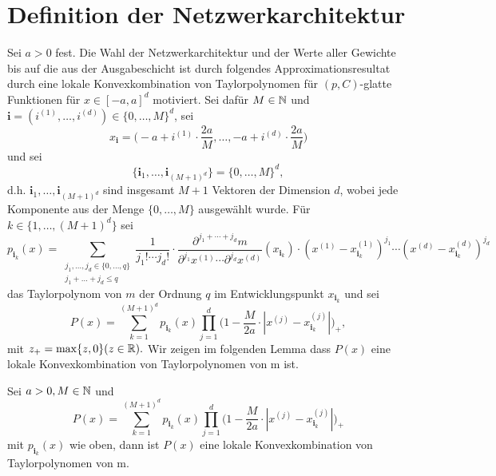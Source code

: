 \section{Definition der Netzwerkarchitektur}
Sei $a > 0$ fest. Die Wahl der Netzwerkarchitektur und der Werte aller Gewichte bis auf die aus der Ausgabeschicht ist durch folgendes Approximationsresultat durch eine lokale Konvexkombination von Taylorpolynomen für $(p,C)$-glatte Funktionen für $x \in [-a, a]^d$ motiviert. 
Sei dafür $M \in \mathbb{N}$ und $\mathbf{i} = (i^{(1)},\dots,i^{(d)}) \in \{0,\dots, M\}^d$, sei
$$x_{\mathbf{i}} = \bigg( -a + i^{(1)} \cdot \frac{2a}{M},\dots, -a + i^{(d)} \cdot \frac{2a}{M}\bigg)$$
und sei
$$\{\mathbf{i}_1,\dots, \mathbf{i}_{(M + 1)^d}\} = \{0,\dots,M\}^d,$$
d.h.  $\mathbf{i}_1,\dots,\mathbf{
i}_{(M + 1)^d}$ sind insgesamt $M + 1$ Vektoren der Dimension $d$, wobei jede Komponente aus der Menge $\{0,\dots,M\}$ ausgewählt wurde.
Für $k \in \{1,\dots,(M + 1)^d\}$ sei
$$p_{\mathbf{i}_k}(x) = \sum_{\substack{j_1,\dots,j_d \in \{0,\dots,q\} \\j_1+\dots +j_d \leq q}} \frac{1}{j_1! \cdots j_d!} \cdot \frac{\partial^{j_1+\cdots + j_d} m}{\partial^{j_1} x^{(1)}\cdots \partial^{j_d} x^{(d)}}(x_{\mathbf{i}_k}) \cdot (x^{(1)} - x_{\mathbf{i}_k}^{(1)})^{j_1} \cdots (x^{(d)} - x_{\mathbf{i}_k}^{(d)})^{j_d}$$
das Taylorpolynom von $m$ der Ordnung $q$ im Entwicklungspunkt $x_{\mathbf{i}_k}$ und sei
\begin{equation}
\label{konvexkomb}
P(x) = \sum_{k = 1}^{(M + 1)^d} p_{\mathbf{i}_k}(x) \prod_{j = 1}^{d} \bigg(1 - \frac{M}{2a} \cdot |x^{(j)} - x_{\mathbf{i}_k}^{(j)}|\bigg)_+,
\end{equation}
 mit $z_+ = \max\{z, 0\} (z \in \mathbb{R}).$
Wir zeigen im folgenden Lemma dass $P(x)$ eine lokale Konvexkombination von Taylorpolynomen von m ist.
\begin{lem}
\label{lem:loccon}
Sei $a >0, M \in \mathbb{N}$ und $$P(x) = \sum_{k = 1}^{(M + 1)^d} p_{\mathbf{i}_k}(x) \prod_{j = 1}^{d} \bigg(1 - \frac{M}{2a} \cdot |x^{(j)} - x_{\mathbf{i}_k}^{(j)}|\bigg)_+$$ mit $p_{\mathbf{i}_k}(x)$ wie oben, dann ist $P(x)$ eine lokale Konvexkombination von Taylorpolynomen von m.
\end{lem}
